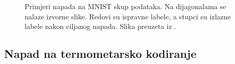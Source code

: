 \documentclass[utf8, diplomski]{fer}
\begin{document}
\begin{figure}[H]
  \centering
  \hfill
  \caption{Primjeri napada na MNIST skup podataka. Na dijagonalama se nalaze izvorne slike. Redovi su ispravne labele, a stupci su izlazne labele nakon ciljanog napada. Slika preuzeta iz \citep{Carlini2017TowardsET}.}
\end{figure}\label{fig:mnist_carlini}

\subsection{Napad na termometarsko kodiranje}
\end{document}

